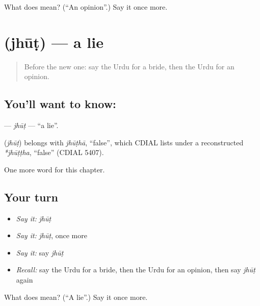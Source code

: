 \begin{tcolorbox}[breakable,colback=teal!4,colframe=teal!35!black,title={Before you move on}]
What does  mean? (\textquotedblleft{}An opinion\textquotedblright{}.) Say it once more.
\end{tcolorbox}
\section[\texorpdfstring{\ur{جھوٹ} (jhūṭ)}{جھوٹ (jhūṭ)}]{ (jhūṭ) — a lie}

\label{lesson:UR-C231-jhut}



\begin{quote}
Before the new one: say the Urdu for a bride, then the Urdu for an opinion.
\end{quote}

\subsection*{You'll want to know: }
\textbf{} — \emph{jhūṭ} — \textquotedblleft{}a lie\textquotedblright{}.

\begin{cousinweb}
\textbf{} (\emph{jhūṭ}) belongs with \emph{jhūṭhā}, \textquotedblleft{}false\textquotedblright{}, which CDIAL lists under a reconstructed \emph{*jhūṭṭha}, \textquotedblleft{}false\textquotedblright{} (CDIAL 5407).
\end{cousinweb}

\begin{grammarlens}[title={What you've built}]
One more word for this chapter.
\end{grammarlens}

\subsection*{Your turn}
\begin{itemize}
\raggedright
  \item \emph{Say it:} \emph{jhūṭ}
  \item \emph{Say it:} \emph{jhūṭ}, once more
  \item \emph{Say it:} say \emph{jhūṭ}
  \item \emph{Recall:} say the Urdu for a bride, then the Urdu for an opinion, then say \emph{jhūṭ} again
\end{itemize}

\begin{tcolorbox}[breakable,colback=teal!4,colframe=teal!35!black,title={Before you move on}]
What does  mean? (\textquotedblleft{}A lie\textquotedblright{}.) Say it once more.
\end{tcolorbox}
